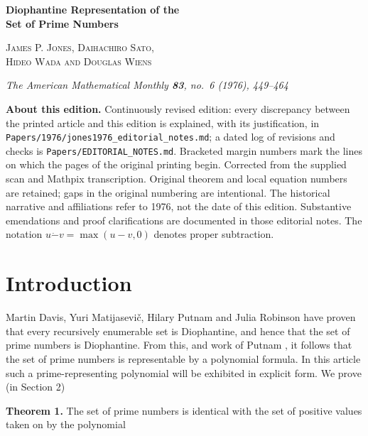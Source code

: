 \documentclass[10pt,letterpaper]{article}
\newcommand{\origpage}[1]{\marginnote{\footnotesize\textbf{[#1]}}}
\newcommand{\dotminus}{\mathbin{\dot{-}}}
\newcommand{\statement}[1]{\par\medskip\noindent\textbf{#1}\enspace}
\begin{document}
\begin{center}
{\Large\bfseries Diophantine Representation of the\\[3pt] Set of Prime Numbers\par}
\vspace{8pt}
{\scshape James P. Jones, Daihachiro Sato,\\ Hideo Wada and Douglas Wiens\par}
\vspace{7pt}
{\small\itshape The American Mathematical Monthly \textbf{83}, no.\ 6 (1976), 449--464\par}
\end{center}
\noindent\begin{minipage}{\linewidth}\small
\textbf{About this edition.} Continuously revised edition: every discrepancy between the printed article and this edition is explained, with its justification, in \texttt{Papers/1976/}\allowbreak\texttt{jones1976\_editorial\_notes.md}; a dated log of revisions and checks is \texttt{Papers/EDITORIAL\_NOTES.md}. Bracketed margin numbers mark the lines on which the pages of the original printing begin. Corrected from the supplied scan and Mathpix transcription.
Original theorem and local equation numbers are retained; gaps in the original numbering are intentional.
The historical narrative and affiliations refer to 1976, not the date of this edition.
Substantive emendations and proof clarifications are documented in those
editorial notes. The notation $u\dotminus v=\max(u-v,0)$ denotes proper subtraction.
\end{minipage}
\medskip
\section{Introduction}
\origpage{449}Martin Davis, Yuri Matijasevič, Hilary Putnam and Julia Robinson \cite{ref4} \cite{ref8} have proven that every recursively enumerable set is Diophantine, and hence that the set of prime numbers is Diophantine. From this, and work of Putnam \cite{ref12}, it follows that the set of prime numbers is representable by a polynomial formula. In this article such a prime-representing polynomial will be exhibited in explicit form. We prove (in Section 2)

\statement{Theorem 1.} The set of prime numbers is identical with the set of positive values taken on by the polynomial
\end{document}
